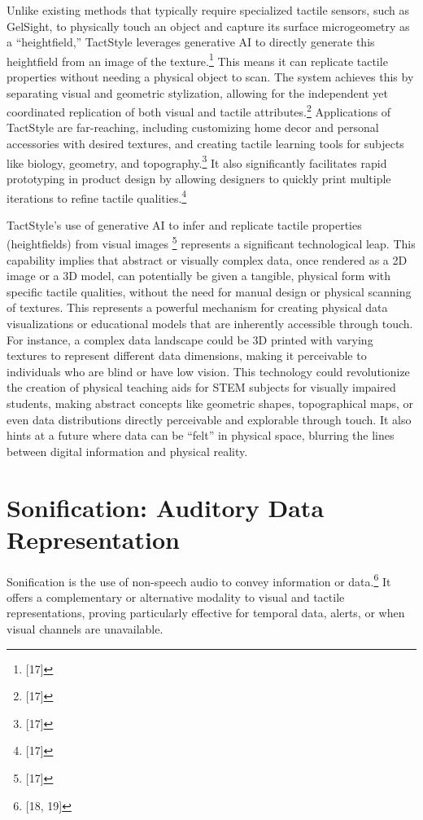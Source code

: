 Unlike existing methods that typically require specialized tactile sensors, such as GelSight, to physically touch an object and capture its surface microgeometry as a ``heightfield,'' TactStyle leverages generative AI to directly generate this heightfield from an image of the texture.\footnote{[17]} This means it can replicate tactile properties without needing a physical object to scan. The system achieves this by separating visual and geometric stylization, allowing for the independent yet coordinated replication of both visual and tactile attributes.\footnote{[17]} Applications of TactStyle are far-reaching, including customizing home decor and personal accessories with desired textures, and creating tactile learning tools for subjects like biology, geometry, and topography.\footnote{[17]} It also significantly facilitates rapid prototyping in product design by allowing designers to quickly print multiple iterations to refine tactile qualities.\footnote{[17]}

TactStyle's use of generative AI to infer and replicate tactile properties (heightfields) from visual images \footnote{[17]} represents a significant technological leap. This capability implies that abstract or visually complex data, once rendered as a 2D image or a 3D model, can potentially be given a tangible, physical form with specific tactile qualities, without the need for manual design or physical scanning of textures. This represents a powerful mechanism for creating physical data visualizations or educational models that are inherently accessible through touch. For instance, a complex data landscape could be 3D printed with varying textures to represent different data dimensions, making it perceivable to individuals who are blind or have low vision. This technology could revolutionize the creation of physical teaching aids for STEM subjects for visually impaired students, making abstract concepts like geometric shapes, topographical maps, or even data distributions directly perceivable and explorable through touch. It also hints at a future where data can be ``felt'' in physical space, blurring the lines between digital information and physical reality.

\section{Sonification: Auditory Data Representation}
Sonification is the use of non-speech audio to convey information or data.\footnote{[18, 19]} It offers a complementary or alternative modality to visual and tactile representations, proving particularly effective for temporal data, alerts, or when visual channels are unavailable.

